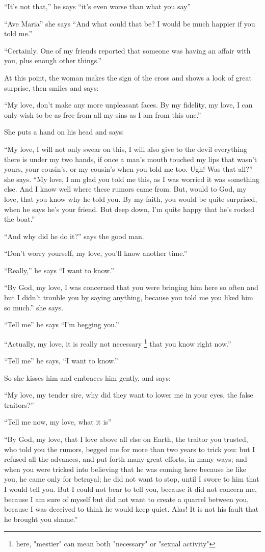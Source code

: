 \documentclass{book}
\begin{document}
``It's not that,'' he says ``it's even worse than what you say''

``Ave Maria'' she says ``And what could that be? I would be much happier if you told me.''

``Certainly. One of my friends reported that someone was having an affair with you, plus enough other things.''

At this point, the woman makes the sign of the cross and shows a look of great surprise, then smiles and says:

``My love, don't make any more unpleasant faces. By my fidelity, my love, I can only wish to be as free from all my sins as I am from this one.''

She puts a hand on his head and says:

``My love, I will not only swear on this, I will also give to the devil everything there is under my two hands, if once a man's mouth touched my lips that wasn't yours, your cousin's, or my cousin's when you told me too. Ugh! Was that all?'' she says. ``My love, I am glad you told me this, as I was worried it was something else. And I know well where these rumors came from. But, would to God, my love, that you know why he told you. By my faith, you would be quite surprised, when he says he's your friend. But deep down, I'm quite happy that he's rocked the boat.''

``And why did he do it?'' says the good man.

``Don't worry yourself, my love, you'll know another time.''

``Really,'' he says ``I want to know.''

``By God, my love, I was concerned that you were bringing him here so often and but I didn't trouble you by saying anything, because you told me you liked him so much.'' she says.

``Tell me'' he says ``I'm begging you.''

``Actually, my love, it is really not necessary
\footnote{here, "mestier" can mean both "necessary" or "sexual activity"}
 that you know right now.''

``Tell me'' he says, ``I want to know.''

So she kisses him and embraces him gently, and says:

``My love, my tender sire, why did they want to lower me in your eyes, the false traitors?''

``Tell me now, my love, what it is''

``By God, my love, that I love above all else on Earth, the traitor you trusted, who told you the rumors, begged me for more than two years to trick you: but I refused all the advances, and put forth many great efforts, in many ways; and when you were tricked into believing that he was coming here because he like you, he came only for betrayal; he did not want to stop, until I swore to him that I would tell you. But I could not bear to tell you, because it did not concern me, because I am sure of myself but did not want to create a quarrel between you, because I was deceived to think he would keep quiet. Alas! It is not his fault that he brought you shame.''
\end{document}
